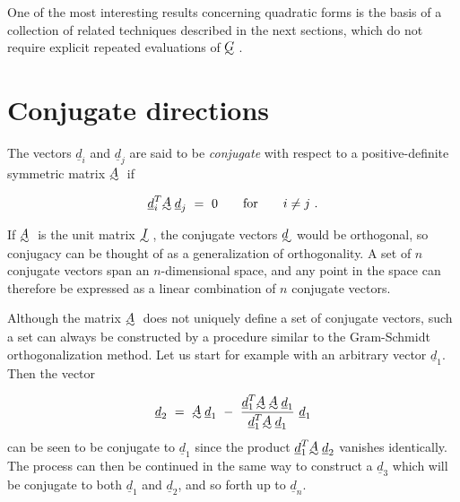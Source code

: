      One of the most interesting results concerning quadratic forms is
the basis of a collection of related techniques described in the next
sections, which do not require explicit repeated evaluations of $\UTG$.
 
 
\section{Conjugate directions}
\label{sec:conjdir2}
 
     The vectors ${\underline{d}}_i$ and ${\underline{d}}_j$ are said to be {\em conjugate} with
respect to a positive-definite symmetric matrix $\UTA$ if
 
 $${\underline{d}}^T_i \UTA{\underline{d}}_j~=~0\qquad {\rm for}\qquad i \neq j~.$$
 
If $\UTA$ is the unit matrix $\UTI$, the conjugate vectors $\UTd$ would be orthogonal,
so conjugacy can be thought of as a generalization of orthogonality. A
set of $n$ conjugate vectors span an $n$-dimensional space, and any point
in the space can therefore be expressed as a linear combination of $n$
conjugate vectors.
 
     Although the matrix $\UTA$ does not uniquely define a set of conjugate
vectors, such a set can always be constructed by a procedure similar to
the Gram-Schmidt orthogonalization method.  Let us start for example
with an arbitrary vector ${\underline{d}}_1$.  Then the vector
 
 $${\underline{d}}_2~=~\UTA{\underline{d}}_1~-~{{\underline{d}}^T_1
\UTA\UTA{\underline{d}}_1\over {\underline{d}}^T_1 \UTA{\underline{d}}_1}~{\underline{d}}_1$$
can be seen to be conjugate to ${\underline{d}}_1$ since the product ${\underline{d}}^T_1 \UTA
{\underline{d}}_2$ vanishes
identically.  The process can then be continued in the same way to
construct a ${\underline{d}}_3$ which will be conjugate to both ${\underline{d}}_1$ and 
${\underline{d}}_2$,
and so forth up to ${\underline{d}}_n$.
 
